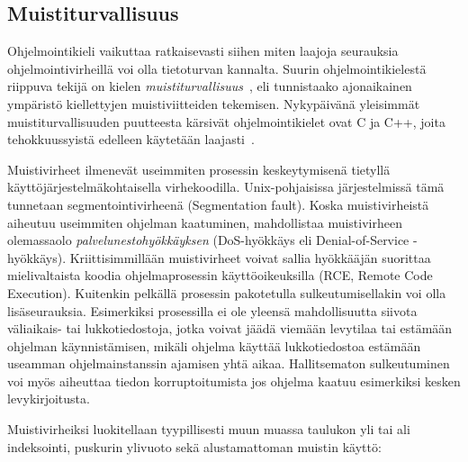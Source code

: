 \subsection{Muistiturvallisuus}
\label{Muistivirheet}

Ohjelmointikieli vaikuttaa ratkaisevasti siihen miten laajoja seurauksia ohjelmointivirheillä voi olla tietoturvan kannalta.
Suurin ohjelmointikielestä riippuva tekijä on kielen \emph{muistiturvallisuus}~\cite{SoftBound},
eli tunnistaako ajonaikainen ympäristö kiellettyjen muistiviitteiden tekemisen.
Nykypäivänä yleisimmät muistiturvallisuuden puutteesta kärsivät ohjelmointikielet ovat C ja C++,
joita tehokkuussyistä edelleen käytetään laajasti~\cite{StaticallyDetecting,SoftBound}.

Muistivirheet ilmenevät useimmiten prosessin keskeytymisenä tietyllä
käyt\-tö\-jär\-jes\-tel\-mä\-koh\-tai\-sel\-la virhekoodilla.
Unix-pohjaisissa järjestelmissä tämä tunnetaan segmentointivirheenä (Segmentation fault).
Koska muistivirheistä aiheutuu useimmiten ohjelman kaatuminen,
mahdollistaa muistivirheen olemassaolo \emph{palvelunestohyökkäyksen} (DoS-hyökkäys eli Denial-of-Service -hyökkäys).
Kriittisimmillään muistivirheet voivat sallia hyökkääjän suorittaa mielivaltaista koodia
ohjelmaprosessin käyttöoikeuksilla (RCE, Remote Code Execution). 
Kuitenkin pelkällä prosessin pakotetulla sulkeutumisellakin voi olla lisäseurauksia.
Esimerkiksi prosessilla ei ole yleensä mahdollisuutta siivota väliaikais- tai lukkotiedostoja,
jotka voivat jäädä viemään levytilaa tai estämään ohjelman käyn\-nis\-tä\-mi\-sen,
mikäli ohjelma käyttää lukkotiedostoa es\-tä\-mään useamman ohjelmainstanssin ajamisen yhtä aikaa.
Hallitsematon sulkeutuminen voi myös aiheuttaa tiedon korruptoitumista jos ohjelma kaatuu esimerkiksi kesken levykirjoitusta.

Muistivirheiksi luokitellaan tyypillisesti muun muassa
taulukon yli tai ali indeksointi, puskurin ylivuoto sekä alustamattoman muistin käyttö:

